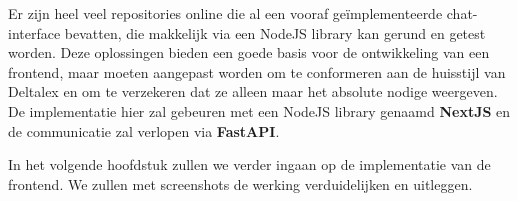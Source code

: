 Er zijn heel veel repositories online die al een vooraf geïmplementeerde chat-interface bevatten, die makkelijk via een NodeJS library kan gerund en getest worden. 
Deze oplossingen bieden een goede basis voor de ontwikkeling van een frontend, maar moeten aangepast worden om te conformeren aan de huisstijl van Deltalex en om te verzekeren dat ze alleen maar het absolute nodige weergeven. \\

De implementatie hier zal gebeuren met een NodeJS library genaamd \textbf{NextJS} en de communicatie zal verlopen via \textbf{FastAPI}.


In het volgende hoofdstuk zullen we verder ingaan op de implementatie van de frontend. 
We zullen met screenshots de werking verduidelijken en uitleggen. 
